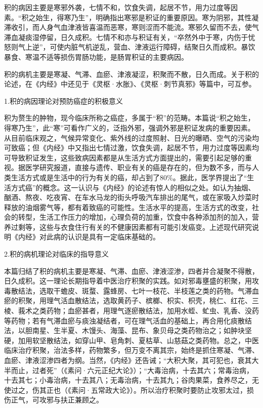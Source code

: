 \documentclass[draft,12pt]{ctexbook}
\begin{document}


积的病因主要是寒邪外袭，七情不和，饮食失调，起居不节，用力过度等因素。“积之始生，得寒乃生”，明确指出寒邪是积证的重要原因。寒为阴邪，其性凝滞收引，而人身气血津液皆喜温而恶寒，寒则涩而不能流。寒邪久留而不去，使气滞血凝痰湿停留，日久成积。七情不和亦与积证有关，“卒然外中于寒，内伤于忧怒则气上逆”，可使内脏气机逆乱，营血、津液运行障碍，结聚日久而成积。暴饮暴食、寒温不适等损伤胃肠功能，是肠胃积证的主要病因。

积的病机主要是寒凝、气滞、血瘀、津液凝涩，积聚而不散，日久而成。关于积的论述，在《内经》中还见于《灵枢·水胀》、《灵枢·刺节真邪》等篇中，可互参。


1.积的病因理论对预防癌症的积极意义

积为赘生的肿物，现今临床所称之癌症，多属于“积”的范畴。本篇说“积之始生，得寒乃生”，此“寒”可看作广义的，泛指外邪，强调外邪是积证发病的重要因素。从目前临床观之，气候异常变化、紫外线的过度照射、日光的曝晒、空气的污染均可致癌；但《内经》中又指出七情过激，饮食失调，起居不节，用力过度等因素均可导致积证发生，这些致病因素都是从生活方式方面提出的，需要引起足够的重视。据医学研究报道，直接与遗传、职业有关的癌是存在的，但为数不多，而与人类生活方式或是生活中的行为有关的癌，却占到了80\%。据此，医学界提出了“生活方式癌”的概念。这一认识与《内经》的论述有惊人的相似之处。如认为抽烟、酗酒、熬夜、吃夜宵、在车水马龙的街头呼吸汽车排出的尾气，或在家吸入炒菜时释放的油烟雾气等，都有着致癌的可能性。生活水平的提高，生活方式的改变，社会的转型，生活工作压力的增加，心理负荷的加重，饮食中各种添加剂的加入，营养过剩等，这些与衣食住行有关的不健康因素都有可能引发癌变。上述现代研究说明《内经》对此病的认识是具有一定临床基础的。

2.积的病机理论对临床的指导意义

本篇归结了积的病机主要是寒凝、气滞、血瘀、津液涩渗，四者并合凝聚不得散，日久成积。这一理论长期指导着中医治疗积聚的实践。如对邪毒壅盛的积聚，用攻毒散结法，选取干蟾皮、斑蝥、露蜂房、七叶一枝花、半枝莲之类的药物。气滞血瘀的积聚，用理气活血散结法，选取黄药子、槟榔、枳实、枳壳，桃仁、红花、三棱、莪术之类药物；血瘀甚者，用理气逐瘀散结法，加用水蛭、虻虫、乳香、没药等药物；若有气滞血瘀与痰浊凝结者，可在理气活血的基础上，再合用化痰散结法，以胆南星、生半夏、木馒头、海藻、昆布、象贝母之类药物治之；如肿块坚硬，加用软坚散结法，如穿山甲、皂角刺、夏枯草、山慈菇之类药物。总之，中医临床治疗积聚，治法多样，药物繁多，但万变不离其宗，始终是抓住寒凝、气滞、血瘀、津液涩渗四者为纲。当然，《内经》还告诫；“大积大聚，其可犯也，衰其大半而止，过者死”（《素问·六元正纪大论》）；“大毒治病，十去其六；常毒治病，十去其七；小毒治病，十去其八；无毒治病，十去其九；谷肉果菜，食养尽之，无使过之，伤其正也（《素问·五常政大论》）。所以治疗积聚时要防止攻邪太过，损伤正气，可攻邪与扶正兼顾之。
\end{document}
